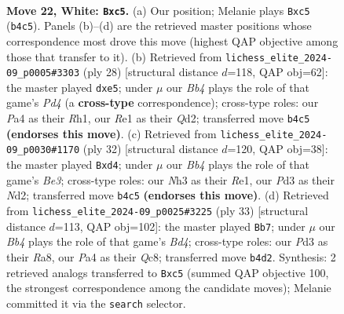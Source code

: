 \documentclass[11pt]{article}
\begin{document}
\clearpage

\begin{figure}[p]\centering
\begin{subfigure}{0.46\textwidth}\centering
\resizebox{\linewidth}{!}{%
\newchessgame
\chessboard[
  setfen={2bqnkr1/r3bp2/p5p1/n1ppp2p/PB2P3/3PQ2N/BPP2PPP/RN2R1K1 w - - 0 22},
  showmover=false,
  pgfstyle=straightmove, color=movearrow, markmove={b4-c5}
]}
\caption{}
\end{subfigure}\hfill
\begin{subfigure}{0.46\textwidth}\centering
\resizebox{\linewidth}{!}{%
\newchessgame
\chessboard[
  setfen={r3k2r/ppqnnpp1/2pb2b1/4p1Pp/2PP1B1P/P1N2B2/1P1QNP2/R3K2R w KQkq - 0 15},
  showmover=false,
  pgfstyle=straightmove, color=movearrow, markmove={d4-e5}
]}
\caption{}
\end{subfigure}
\\[4pt]
\begin{subfigure}{0.46\textwidth}\centering
\resizebox{\linewidth}{!}{%
\newchessgame
\chessboard[
  setfen={r2qr1k1/1p1n1pp1/p1p2b1p/2Pp1b2/PP1p4/2Q1B1P1/3NPPBP/R3R1K1 w - - 0 17},
  showmover=false,
  pgfstyle=straightmove, color=movearrow, markmove={e3-d4}
]}
\caption{}
\end{subfigure}\hfill
\begin{subfigure}{0.46\textwidth}\centering
\resizebox{\linewidth}{!}{%
\newchessgame
\chessboard[
  setfen={r1qr2k1/p1p1ppbp/1p2n1p1/3bP3/1PP1NP2/1Q2B1P1/P5BP/R3R1K1 b - - 0 17},
  showmover=false,
  pgfstyle=straightmove, color=movearrow, markmove={d5-b7}
]}
\caption{}
\end{subfigure}
\caption{\textbf{Move 22, White: \texttt{Bxc5}.} (a) Our position; Melanie plays \texttt{Bxc5} (\texttt{b4c5}). Panels (b)--(d) are the retrieved master positions whose correspondence most drove this move (highest QAP objective among those that transfer to it). (b) Retrieved from \texttt{lichess\_elite\_2024-09\_p0005\#3303} (ply 28) [structural distance $d$=118, QAP obj=62]: the master played \texttt{dxe5}; under $\mu$ our \emph{Bb4} plays the role of that game's \emph{Pd4} (a \textbf{cross-type} correspondence); cross-type roles: our \emph{P}a4 as their \emph{R}h1, our \emph{R}e1 as their \emph{Q}d2; transferred move \texttt{b4c5} \textbf{(endorses this move)}. (c) Retrieved from \texttt{lichess\_elite\_2024-09\_p0030\#1170} (ply 32) [structural distance $d$=120, QAP obj=38]: the master played \texttt{Bxd4}; under $\mu$ our \emph{Bb4} plays the role of that game's \emph{Be3}; cross-type roles: our \emph{N}h3 as their \emph{R}e1, our \emph{P}d3 as their \emph{N}d2; transferred move \texttt{b4c5} \textbf{(endorses this move)}. (d) Retrieved from \texttt{lichess\_elite\_2024-09\_p0025\#3225} (ply 33) [structural distance $d$=113, QAP obj=102]: the master played \texttt{Bb7}; under $\mu$ our \emph{Bb4} plays the role of that game's \emph{Bd4}; cross-type roles: our \emph{P}d3 as their \emph{R}a8, our \emph{P}a4 as their \emph{Q}c8; transferred move \texttt{b4d2}. Synthesis: 2 retrieved analogs transferred to \texttt{Bxc5} (summed QAP objective 100, the strongest correspondence among the candidate moves); Melanie committed it via the \texttt{search} selector.}
\label{fig:thought-m42}
\end{figure}
\end{document}
